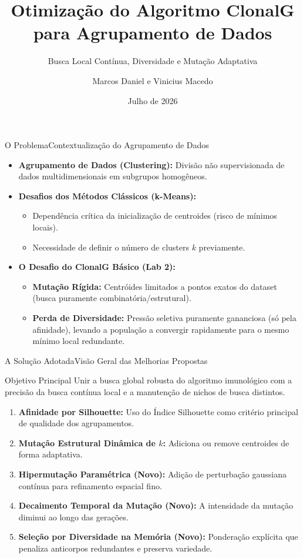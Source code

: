 \documentclass[aspectratio=169, 11pt]{beamer}
\title[ClonalG Otimizado para Clustering]{Otimização do Algoritmo ClonalG para Agrupamento de Dados}
\subtitle{Busca Local Contínua, Diversidade e Mutação Adaptativa}
\author[Marcos e Vinicius]{Marcos Daniel e Vinicius Macedo}
\institute[IFNMG]{Instituto Federal do Norte de Minas Gerais}
\date{Julho de 2026}
\begin{document}
\begin{frame}
  \titlepage
\end{frame}

\begin{frame}{O Problema}{Contextualização do Agrupamento de Dados}
  \begin{itemize}
    \item \textbf{Agrupamento de Dados (Clustering):} Divisão não supervisionada de dados multidimensionais em subgrupos homogêneos.
    \item \textbf{Desafios dos Métodos Clássicos (k-Means):}
      \begin{itemize}
        \item Dependência crítica da inicialização de centroides (risco de mínimos locais).
        \item Necessidade de definir o número de clusters $k$ previamente.
      \end{itemize}
    \item \textbf{O Desafio do ClonalG Básico (Lab 2):}
      \begin{itemize}
        \item \textbf{Mutação Rígida:} Centróides limitados a pontos exatos do dataset (busca puramente combinatória/estrutural).
        \item \textbf{Perda de Diversidade:} Pressão seletiva puramente gananciosa (só pela afinidade), levando a população a convergir rapidamente para o mesmo mínimo local redundante.
      \end{itemize}
  \end{itemize}
\end{frame}

\begin{frame}{A Solução Adotada}{Visão Geral das Melhorias Propostas}
  \begin{block}{Objetivo Principal}
    Unir a busca global robusta do algoritmo imunológico com a precisão da busca contínua local e a manutenção de nichos de busca distintos.
  \end{block}
  \begin{enumerate}
    \item \textbf{Afinidade por Silhouette:} Uso do Índice Silhouette como critério principal de qualidade dos agrupamentos.
    \item \textbf{Mutação Estrutural Dinâmica de $k$:} Adiciona ou remove centroides de forma adaptativa.
    \item \textbf{Hipermutação Paramétrica (Novo):} Adição de perturbação gaussiana contínua para refinamento espacial fino.
    \item \textbf{Decaimento Temporal da Mutação (Novo):} A intensidade da mutação diminui ao longo das gerações.
    \item \textbf{Seleção por Diversidade na Memória (Novo):} Ponderação explícita que penaliza anticorpos redundantes e preserva variedade.
  \end{enumerate}
\end{frame}
\end{document}
